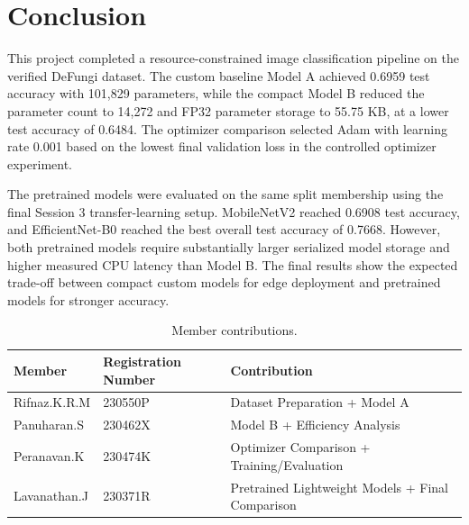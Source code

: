 \section{Conclusion}

This project completed a resource-constrained image classification pipeline on the verified DeFungi dataset. The custom baseline Model A achieved 0.6959 test accuracy with 101,829 parameters, while the compact Model B reduced the parameter count to 14,272 and FP32 parameter storage to 55.75 KB, at a lower test accuracy of 0.6484. The optimizer comparison selected Adam with learning rate 0.001 based on the lowest final validation loss in the controlled optimizer experiment.

The pretrained models were evaluated on the same split membership using the final Session 3 transfer-learning setup. MobileNetV2 reached 0.6908 test accuracy, and EfficientNet-B0 reached the best overall test accuracy of 0.7668. However, both pretrained models require substantially larger serialized model storage and higher measured CPU latency than Model B. The final results show the expected trade-off between compact custom models for edge deployment and pretrained models for stronger accuracy.

\begin{table}[H]
\centering
\caption{Member contributions.}
\label{tab:member_contributions}
\begin{tabularx}{\linewidth}{lll}
\toprule
Member & Registration Number & Contribution \\
\midrule
Rifnaz.K.R.M & 230550P & Dataset Preparation + Model A \\
Panuharan.S & 230462X & Model B + Efficiency Analysis \\
Peranavan.K & 230474K & Optimizer Comparison + Training/Evaluation \\
Lavanathan.J & 230371R & Pretrained Lightweight Models + Final Comparison \\
\bottomrule
\end{tabularx}
\end{table}
